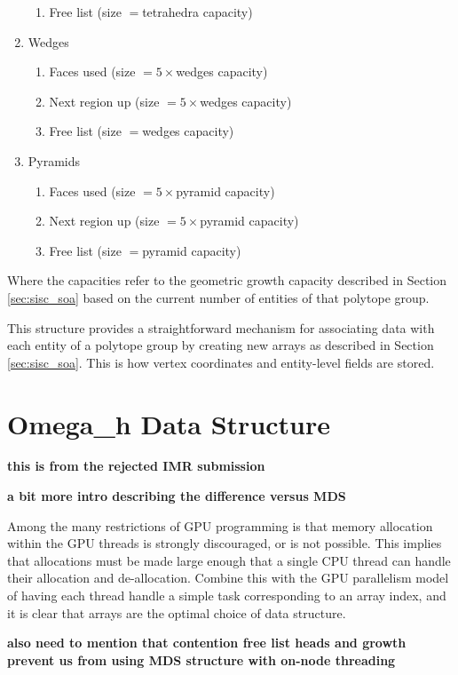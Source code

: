 \begin{enumerate}
\begin{enumerate}
  \item Free list (size $=$tetrahedra capacity)
  \end{enumerate}
\item Wedges
  \begin{enumerate}
  \item Faces used (size $=5\times$wedges capacity)
  \item Next region up (size $=5\times$wedges capacity)
  \item Free list (size $=$wedges capacity)
  \end{enumerate}
\item Pyramids
  \begin{enumerate}
  \item Faces used (size $=5\times$pyramid capacity)
  \item Next region up (size $=5\times$pyramid capacity)
  \item Free list (size $=$pyramid capacity)
  \end{enumerate}
\end{enumerate}
Where the capacities refer to the geometric growth
capacity described in Section \ref{sec:sisc_soa} based
on the current number of entities of that polytope group.

This structure provides a straightforward mechanism for associating
data with each entity of a polytope group by creating
new arrays as described in Section \ref{sec:sisc_soa}.
This is how vertex coordinates and entity-level fields
are stored.


\section{Omega\_h Data Structure}
\label{sec:omega_h-struct}

{\bf this is from the rejected IMR submission}

{\bf a bit more intro describing the difference
versus MDS}

Among the many restrictions of GPU programming
is that memory allocation within the GPU threads is strongly
discouraged, or is not possible.
This implies that allocations must be made large enough
that a single CPU thread can handle their allocation and de-allocation.
Combine this with the GPU parallelism model of having each
thread handle a simple task corresponding to an array index, and
it is clear that arrays are the optimal choice of data structure.

{\bf also need to mention that contention free list
heads and growth prevent us from using MDS structure
with on-node threading}

